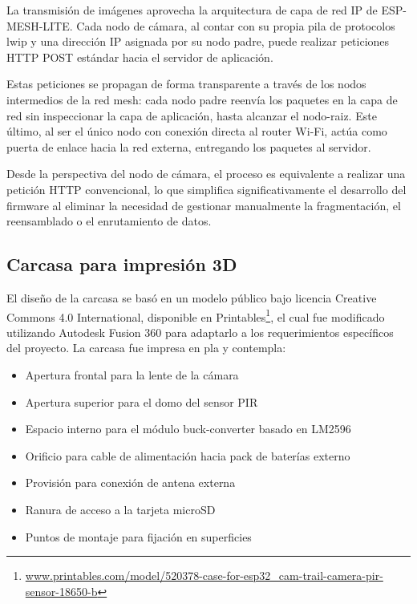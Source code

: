 \documentclass[a4paper, 12pt]{report}
\begin{document}
La transmisión de imágenes aprovecha la arquitectura de capa de red IP de
\gls{ESP-MESH-LITE}. Cada nodo de cámara, al contar con su propia pila de
protocolos \gls{lwip} y una dirección IP asignada por su nodo padre, puede
realizar peticiones HTTP POST estándar hacia el servidor de aplicación.

Estas peticiones se propagan de forma transparente a través de los nodos
intermedios de la red mesh: cada nodo padre reenvía los paquetes en la capa
de red sin inspeccionar la capa de aplicación, hasta alcanzar el \gls{nodo-raiz}.
Este último, al ser el único nodo con conexión directa al router Wi-Fi, actúa
como puerta de enlace hacia la red externa, entregando los paquetes al servidor.

Desde la perspectiva del nodo de cámara, el proceso es equivalente a realizar
una petición HTTP convencional, lo que simplifica significativamente el
desarrollo del firmware al eliminar la necesidad de gestionar manualmente la
fragmentación, el reensamblado o el enrutamiento de datos.

\subsection{Carcasa para impresión 3D}

El diseño de la carcasa se basó en un modelo público bajo licencia
Creative Commons 4.0 International, disponible en
Printables\footnote{\url{www.printables.com/model/520378-case-for-esp32_cam-trail-camera-pir-sensor-18650-b}},
el cual fue modificado utilizando Autodesk Fusion 360 para adaptarlo a los
requerimientos específicos del proyecto. La carcasa fue impresa en \gls{pla}
y contempla:

\begin{itemize}
  \item Apertura frontal para la lente de la cámara
  \item Apertura superior para el domo del sensor PIR
  \item Espacio interno para el módulo \gls{buck-converter} basado en LM2596
  \item Orificio para cable de alimentación hacia pack de baterías externo
  \item Provisión para conexión de antena externa
  \item Ranura de acceso a la tarjeta microSD
  \item Puntos de montaje para fijación en superficies
\end{itemize}
\end{document}
